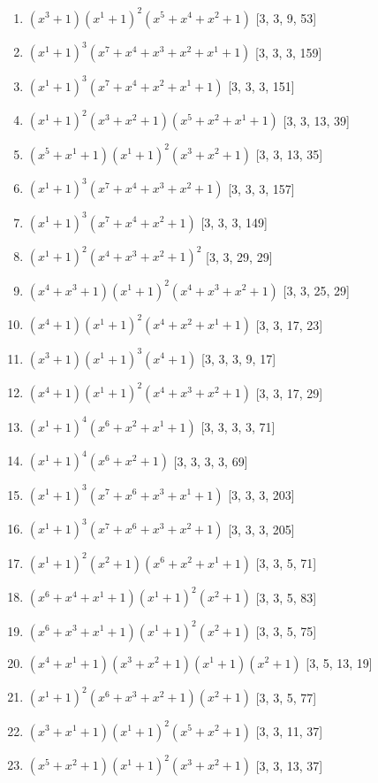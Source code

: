 \documentclass[10pt,twocolumn]{article}
\begin{document}
\begin{enumerate}
\item $(x^{3} + 1)(x^{1} + 1)^{2}(x^{5} + x^{4} + x^{2} + 1)$  [3, 3, 9, 53]
\item $(x^{1} + 1)^{3}(x^{7} + x^{4} + x^{3} + x^{2} + x^{1} + 1)$  [3, 3, 3, 159]
\item $(x^{1} + 1)^{3}(x^{7} + x^{4} + x^{2} + x^{1} + 1)$  [3, 3, 3, 151]
\item $(x^{1} + 1)^{2}(x^{3} + x^{2} + 1)(x^{5} + x^{2} + x^{1} + 1)$  [3, 3, 13, 39]
\item $(x^{5} + x^{1} + 1)(x^{1} + 1)^{2}(x^{3} + x^{2} + 1)$  [3, 3, 13, 35]
\item $(x^{1} + 1)^{3}(x^{7} + x^{4} + x^{3} + x^{2} + 1)$  [3, 3, 3, 157]
\item $(x^{1} + 1)^{3}(x^{7} + x^{4} + x^{2} + 1)$  [3, 3, 3, 149]
\item $(x^{1} + 1)^{2}(x^{4} + x^{3} + x^{2} + 1)^{2}$  [3, 3, 29, 29]
\item $(x^{4} + x^{3} + 1)(x^{1} + 1)^{2}(x^{4} + x^{3} + x^{2} + 1)$  [3, 3, 25, 29]
\item $(x^{4} + 1)(x^{1} + 1)^{2}(x^{4} + x^{2} + x^{1} + 1)$  [3, 3, 17, 23]
\item $(x^{3} + 1)(x^{1} + 1)^{3}(x^{4} + 1)$  [3, 3, 3, 9, 17]
\item $(x^{4} + 1)(x^{1} + 1)^{2}(x^{4} + x^{3} + x^{2} + 1)$  [3, 3, 17, 29]
\item $(x^{1} + 1)^{4}(x^{6} + x^{2} + x^{1} + 1)$  [3, 3, 3, 3, 71]
\item $(x^{1} + 1)^{4}(x^{6} + x^{2} + 1)$  [3, 3, 3, 3, 69]
\item $(x^{1} + 1)^{3}(x^{7} + x^{6} + x^{3} + x^{1} + 1)$  [3, 3, 3, 203]
\item $(x^{1} + 1)^{3}(x^{7} + x^{6} + x^{3} + x^{2} + 1)$  [3, 3, 3, 205]
\item $(x^{1} + 1)^{2}(x^{2} + 1)(x^{6} + x^{2} + x^{1} + 1)$  [3, 3, 5, 71]
\item $(x^{6} + x^{4} + x^{1} + 1)(x^{1} + 1)^{2}(x^{2} + 1)$  [3, 3, 5, 83]
\item $(x^{6} + x^{3} + x^{1} + 1)(x^{1} + 1)^{2}(x^{2} + 1)$  [3, 3, 5, 75]
\item $(x^{4} + x^{1} + 1)(x^{3} + x^{2} + 1)(x^{1} + 1)(x^{2} + 1)$  [3, 5, 13, 19]
\item $(x^{1} + 1)^{2}(x^{6} + x^{3} + x^{2} + 1)(x^{2} + 1)$  [3, 3, 5, 77]
\item $(x^{3} + x^{1} + 1)(x^{1} + 1)^{2}(x^{5} + x^{2} + 1)$  [3, 3, 11, 37]
\item $(x^{5} + x^{2} + 1)(x^{1} + 1)^{2}(x^{3} + x^{2} + 1)$  [3, 3, 13, 37]

\end{enumerate}
\end{document}
